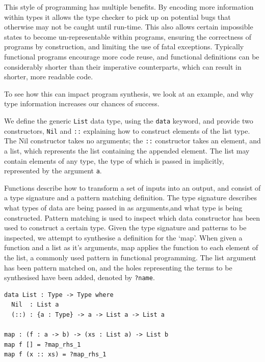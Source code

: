 \documentclass[a4paper]{article}
\begin{document}
This style of programming has multiple benefits. By encoding more 
information within types it allows the type checker to pick up on 
potential bugs that otherwise may not be caught until run-time. This
also allows certain impossible states to become un-representable within
programs, ensuring the correctness of programs by construction, and limiting the use of fatal exceptions. Typically functional programs
encourage more code reuse, and functional definitions can be
considerably shorter than their imperative counterparts, which can
result in shorter, more readable code.

To see how this can impact program synthesis, we look at an example, 
and why type information increases our chances of success. 

We define the generic \texttt{List} data type, using the \texttt{data}
keyword, and provide two constructors, \texttt{Nil} and \texttt{::}
explaining how to construct elements of the list type. The Nil constructor takes no arguments; the \texttt{::} constructor takes an element, and
a list, which represents the list containing the appended element.
The list may contain elements of any type, the type of which is
passed in implicitly, represented by the argument \texttt{a}.

Functions describe how to transform a set of inputs into an output, and
consist of a type signature and a pattern matching definition. The type
signature describes what types of data are being passed in as arguments,and what type is being constructed. Pattern matching is used to inspect
which data constructor has been used to construct a certain type.
Given the type signature and patterns to be inspected, we attempt to
synthesise a definition for the `map'. When given a function and
a list as it's arguments, map applies the function to each element of
the list, a commonly used pattern in functional programming. The list
argument has been pattern matched on, and the holes representing the
terms to be synthesised
have been added, denoted by \texttt{?name}.

\begin{center}
\begin{verbatim}
data List : Type -> Type where
  Nil  : List a
  (::) : {a : Type} -> a -> List a -> List a

map : (f : a -> b) -> (xs : List a) -> List b 
map f [] = ?map_rhs_1
map f (x :: xs) = ?map_rhs_1
\end{verbatim}
\end{center}
\end{document}
